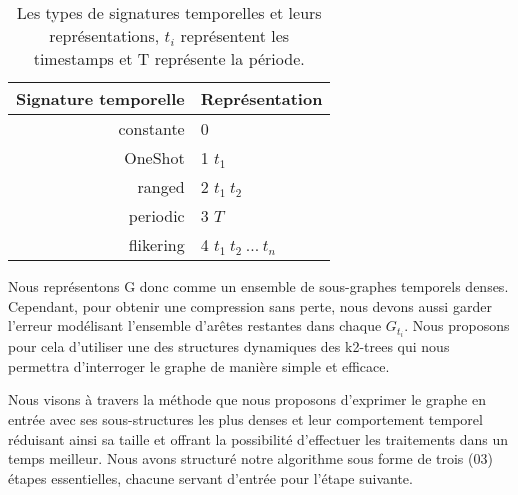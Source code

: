 			\begin{table}[h]
			\label{tab:signtmp}
			\begin{center}
			\begin{tabular}{|r|l|}
			\hline Signature temporelle & Représentation	
			\\\hline constante & 0	
			
			\\\hline OneShot & 1 $t_{1}$	
			
			\\\hline ranged & 2	$t_{1}\ t_{2}$	
			
			\\\hline periodic & 3  $T$	
			
			\\\hline flikering & 4 $t_{1}\ t_{2}\ ...\ t_{n}$	
			
			\\\hline			
			\end{tabular}
			\end{center}
			
			 \caption{\small {Les types de signatures temporelles et leurs représentations, $t_{i}$	 représentent les timestamps et T représente la période.}}
			\end{table}
			
			Nous représentons G donc comme un ensemble de sous-graphes temporels denses. Cependant, pour obtenir une compression sans perte, nous devons aussi garder l'erreur modélisant l'ensemble d'arêtes restantes dans chaque $G_{t_{i}}$. Nous proposons pour cela d'utiliser une des structures dynamiques des k2-trees qui nous permettra d'interroger le graphe de manière simple et efficace.
			
			 Nous visons à travers la méthode que nous proposons d'exprimer le graphe en entrée avec ses sous-structures les plus denses et leur comportement temporel réduisant ainsi sa taille et offrant la possibilité d'effectuer les traitements dans un temps meilleur. Nous avons structuré notre algorithme sous forme de trois (03) étapes essentielles, chacune servant d'entrée pour l'étape suivante.
			 
